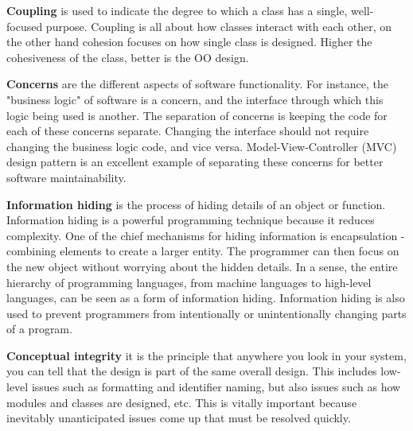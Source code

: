 \documentclass{article}
\begin{document}
			\bigskip
			\textbf{Coupling} is used to indicate the degree to which a class has a single, well-focused purpose. Coupling is all about how classes interact with each other, on the other hand cohesion focuses on how single class is designed. Higher the cohesiveness of the class, better is the OO design.

			\bigskip
			\textbf{Concerns} are the different aspects of software functionality. For instance, the "business logic" of software is a concern, and the interface through which this logic being used is another. The separation of concerns is keeping the code for each of these concerns separate. Changing the interface should not require changing the business logic code, and vice versa. Model-View-Controller (MVC) design pattern is an excellent example of separating these concerns for better software maintainability.

			\textbf{Information hiding} is the process of hiding details of an object or function. Information hiding is a powerful programming technique because it reduces complexity. One of the chief  mechanisms for hiding information is encapsulation - combining elements to create a larger entity. The programmer can then focus on the new object without worrying about the hidden details. In a sense, the entire hierarchy of programming languages, from machine languages to high-level languages, can be seen as a form of information hiding. Information hiding is also used to prevent programmers from intentionally or unintentionally changing parts of a program.

			\textbf{Conceptual integrity} it is the principle that anywhere you look in your system, you can tell that the design is part of the same overall design. This includes low-level issues such as formatting and identifier naming, but also issues such as how modules and classes are designed, etc. This is vitally important because inevitably unanticipated issues come up that must be resolved quickly.
\end{document}
